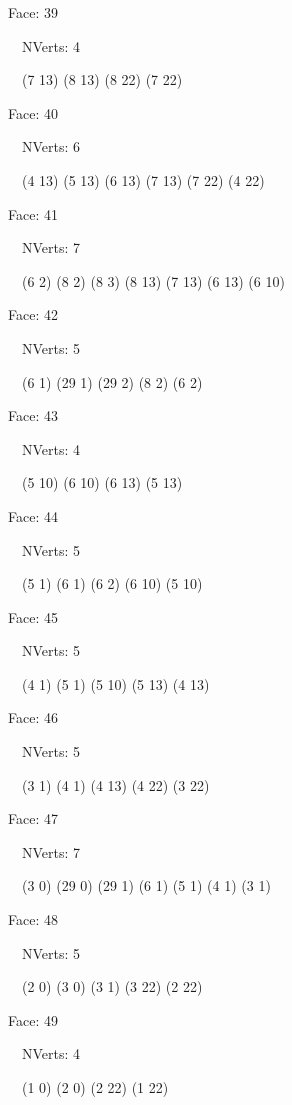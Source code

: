 \documentclass{article}
\begin{document}
{\footnotesize 

Face: 39

\   \    NVerts: 4

 \   \   (7 13) (8 13) (8 22) (7 22)}

{\footnotesize 

Face: 40

\   \    NVerts: 6

 \   \   (4 13) (5 13) (6 13) (7 13) (7 22) (4 22)}

{\footnotesize 

Face: 41

\   \    NVerts: 7

 \   \   (6 2) (8 2) (8 3) (8 13) (7 13) (6 13) (6 10)}

{\footnotesize 

Face: 42

\   \    NVerts: 5

 \   \   (6 1) (29 1) (29 2) (8 2) (6 2)}

{\footnotesize 

Face: 43

\   \    NVerts: 4

 \   \   (5 10) (6 10) (6 13) (5 13)}

{\footnotesize 

Face: 44

\   \    NVerts: 5

 \   \   (5 1) (6 1) (6 2) (6 10) (5 10)}

{\footnotesize 

Face: 45

\   \    NVerts: 5

 \   \   (4 1) (5 1) (5 10) (5 13) (4 13)}

{\footnotesize 

Face: 46

\   \    NVerts: 5

 \   \   (3 1) (4 1) (4 13) (4 22) (3 22)}

{\footnotesize 

Face: 47

\   \    NVerts: 7

 \   \   (3 0) (29 0) (29 1) (6 1) (5 1) (4 1) (3 1)}

{\footnotesize 

Face: 48

\   \    NVerts: 5

 \   \   (2 0) (3 0) (3 1) (3 22) (2 22)}

{\footnotesize 

Face: 49

\   \    NVerts: 4

 \   \   (1 0) (2 0) (2 22) (1 22)}
\end{document}
